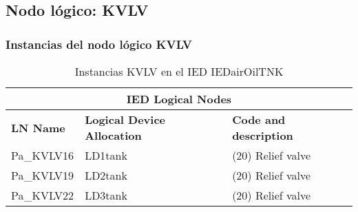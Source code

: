 
\subsection{Nodo l\'ogico: 			 KVLV}

    \subsubsection{Instancias del nodo l\'ogico KVLV}
    \begin{table}[H]
    \begin{center}
    \begin{tabular}{|l|l|p{6.8cm}|}
            \hline
            \multicolumn{3}{|c|}{\cellcolor[gray]{0.8} \textbf{IED Logical Nodes} } \\
            \hline
            \textbf{LN Name} & \textbf{Logical Device Allocation} & \textbf{Code and description} \\
            \hline
            Pa\_KVLV16 & LD1tank & (20) Relief valve \\
            \hline
            Pa\_KVLV19 & LD2tank & (20) Relief valve \\
            \hline
            Pa\_KVLV22 & LD3tank & (20) Relief valve \\
            \hline
    \end{tabular}
    \caption{Instancias KVLV en el IED IEDairOilTNK}
    \label{table:lnInstKVLV_relief}
    \end{center}
    \end{table}
    
    
    
